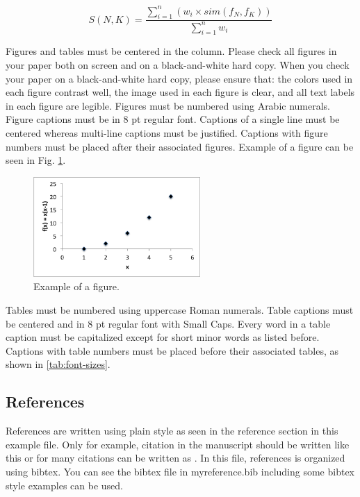 \documentclass[]{indojc}
\begin{document}
\begin{equation}
S(N,K) = \frac{\sum_{i=1}^n(w_i\times sim(f_N,f_K))}{\sum_{i=1}^nw_i}
\label{eq:satu}
\end{equation}


Figures and tables must be centered in the column. Please check all figures in your paper both on screen and on a black-and-white hard copy. When you check your paper on a black-and-white hard copy, please ensure that: the colors used in each figure contrast well, the image used in each figure is clear, and all text labels in each figure are legible. Figures must be numbered using Arabic numerals. Figure captions must be in 8 pt regular font. Captions of a single line must be centered whereas multi-line captions must be justified. Captions with figure numbers must be placed after their associated figures. Example of a figure can be seen in Fig. \ref{fig:oneexample}.

\begin{figure}[!t]
\centering
\includegraphics[width=2.5in, keepaspectratio=true]{fig_example.png}
\caption{Example of a figure.}
\label{fig:oneexample}
\end{figure}

Tables must be numbered using uppercase Roman numerals. Table captions must be centered and in 8 pt regular font with Small Caps. Every word in a table caption must be capitalized except for short minor words as listed before. Captions with table numbers must be placed before their associated tables, as shown in \ref{tab:font-sizes}.

\subsection{References}
References are written using plain style as seen in the reference section in this example file. Only for example, citation in the manuscript should be written like this \cite{kopka1999guide} or for many citations can be written as \cite{lamport1994latex,swope1982computer,huo2007short}. In this file, references is organized using bibtex. You can see the bibtex file in myreference.bib including some bibtex style examples can be used.
\end{document}
